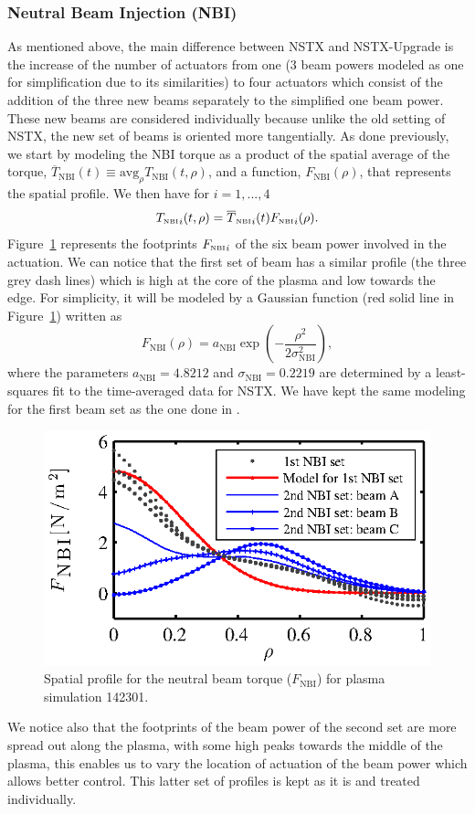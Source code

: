 \documentclass[12pt,lot, lof]{puthesis}
\begin{document}
\subsubsection{Neutral Beam Injection (NBI)}
 \label{NBIAM}
 As mentioned above, the main difference between NSTX and NSTX-Upgrade is the increase of the number of actuators from one (3 beam powers modeled as one for simplification due to its similarities) to four actuators which consist of the addition of the three new beams separately to the simplified one beam power. These new beams are considered individually because unlike the old setting of NSTX, the new set of beams is oriented more tangentially. As done previously, we start by modeling the NBI torque as a product of the spatial average of the torque, $\overline{T}_\text{NBI}(t) \equiv \text{avg}_\rho T_\text{NBI}(t,\rho)$, and a function, $F_\text{NBI}(\rho)$, that represents the spatial profile.
We then have for $i=1,...,4$  
\begin{equation}
{T_\textrm{\tiny{NBI}}}_i(t,\rho) = {\overline{T}_\textrm{\tiny{NBI}}}_i(t) {F_\textrm{\tiny{NBI}}}_i(\rho).
\label{eqn18}
\end{equation}
Figure~{\ref{NBI1}} represents the footprints ${F_\textrm{\tiny{NBI}}}_i$ of the six beam power involved in the actuation. We can notice that the first set of beam has a similar profile (the three grey dash lines) which is high at the core of the plasma and low towards the edge. For simplicity, it will be modeled by a Gaussian function (red solid line in Figure~{\ref{NBI1}}) written as
\begin{equation}
F_\text{NBI}(\rho) = a_\text{NBI} \exp\left( - \frac{\rho^2}{2\sigma^2_\text{NBI}}\right),
\label{eq6}
\end{equation}    
where the parameters $a_\text{NBI} = 4.8212$ and $\sigma_\text{NBI} =0.2219$ are determined by a least-squares fit to the time-averaged data for NSTX. We have kept the same modeling for the first beam set as the one done in \cite{Goumiri15}. 
\begin{figure} 
\centering
\includegraphics [width=0.8 \linewidth]{chap10/fig4} 
\caption{Spatial profile for the neutral beam torque ($F_\text{NBI} $) for
  plasma simulation 142301. }
\label{NBI1}
\end{figure}   
We notice also that the footprints of the beam power of the second set are more spread out along the plasma,  with some high peaks towards the middle of the plasma, this enables us to vary the location of actuation of the beam power which allows better control. This latter set of profiles is kept as it is and treated individually.
\end{document}
